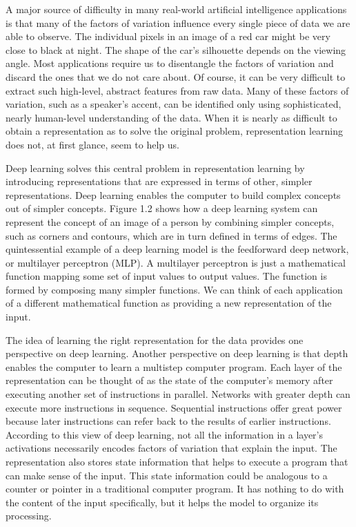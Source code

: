 \documentclass[11pt]{article}
\begin{document}
A major source of diﬃculty in many real-world artificial intelligence applications is that many of the factors of variation inﬂuence every single piece of data we are able to observe.
The individual pixels in an image of a red car might be very close to black at night.
The shape of the car’s silhouette depends on the viewing angle.
Most applications require us to disentangle the factors of variation and discard the ones that we do not care about.
Of course, it can be very diﬃcult to extract such high-level, abstract features from raw data.
Many of these factors of variation, such as a speaker’s accent, can be identified only using sophisticated, nearly human-level understanding of the data.
When it is nearly as diﬃcult to obtain a representation as to solve the original problem, representation learning does not, at first glance, seem to help us.

Deep learning solves this central problem in representation learning by introducing representations that are expressed in terms of other, simpler representations.
Deep learning enables the computer to build complex concepts out of simpler concepts.
Figure 1.2 shows how a deep learning system can represent the concept of an image of a person by combining simpler concepts, such as corners and contours, which are in turn deﬁned in terms of edges.
The quintessential example of a deep learning model is the feedforward deep network, or multilayer perceptron (MLP).
A multilayer perceptron is just a mathematical function mapping some set of input values to output values.
The function is formed by composing many simpler functions.
We can think of each application of a different mathematical function as providing a new representation of the input.

The idea of learning the right representation for the data provides one perspective on deep learning.
Another perspective on deep learning is that depth enables the computer to learn a multistep computer program.
Each layer of the representation can be thought of as the state of the computer’s memory after executing another set of instructions in parallel.
Networks with greater depth can execute more instructions in sequence.
Sequential instructions oﬀer great power because later instructions can refer back to the results of earlier instructions.
According to this view of deep learning, not all the information in a layer’s activations necessarily encodes factors of variation that explain the input.
The representation also stores state information that helps to execute a program that can make sense of the input.
This state information could be analogous to a counter or pointer in a traditional computer program.
It has nothing to do with the content of the input specifically, but it helps the model to organize its processing.
\end{document}
